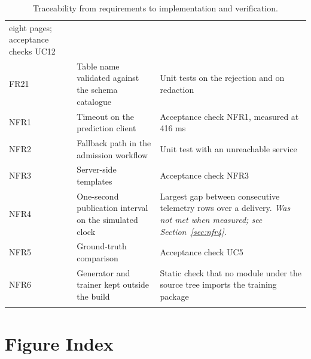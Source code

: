 \documentclass[12pt,a4paper]{report}
\begin{document}
\begin{longtable}{@{}p{}p{}p{}@{}}
eight pages; acceptance checks UC12 \\
FR21 & Table name validated against the schema catalogue & Unit tests on the rejection and on
redaction \\
NFR1 & Timeout on the prediction client & Acceptance check NFR1, measured at 416 ms \\
NFR2 & Fallback path in the admission workflow & Unit test with an unreachable service \\
NFR3 & Server-side templates & Acceptance check NFR3 \\
NFR4 & One-second publication interval on the simulated clock & Largest gap between consecutive
telemetry rows over a delivery. \emph{Was not met when measured; see
Section~\ref{sec:nfr4}.} \\
NFR5 & Ground-truth comparison & Acceptance check UC5 \\
NFR6 & Generator and trainer kept outside the build & Static check that no module under the source
tree imports the training package \\
\bottomrule
\caption{Traceability from requirements to implementation and verification.}
\end{longtable}

\chapter{Figure Index}
\end{document}
